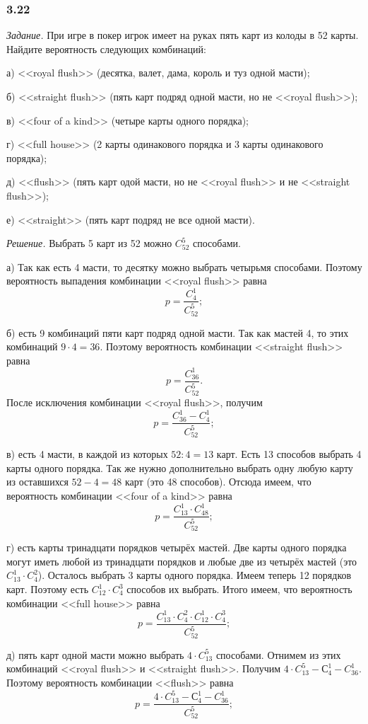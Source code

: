 \documentclass{book}
\begin{document}
\subsubsection*{3.22}

\textit{Задание.} При игре в покер игрок имеет на руках пять карт из колоды в 52 карты.
Найдите вероятность следующих комбинаций:

а) <<royal flush>> (десятка, валет, дама, король и туз одной масти);

б) <<straight flush>> (пять карт подряд одной масти, но не <<royal flush>>);

в) <<four of a kind>> (четыре карты одного порядка);

г) <<full house>> (2 карты одинакового порядка и 3 карты одинакового порядка);

д) <<flush>> (пять карт одой масти, но не <<royal flush>> и не <<straight flush>>);

е) <<straight>> (пять карт подряд не все одной масти).

\textit{Решение.} Выбрать 5 карт из 52 можно $ C_{52}^5 $ способами.

а) Так как есть 4 масти, то десятку можно выбрать четырьмя способами.
Поэтому вероятность выпадения комбинации <<royal flush>> равна
$$ p =
\frac{ C_4^1 }{ C_{52}^5 };$$

б) есть 9 комбинаций пяти карт подряд одной масти.
Так как мастей 4, то этих комбинаций $ 9 \cdot 4 = 36 $.
Поэтому вероятность комбинации <<straight flush>> равна
$$ p =
\frac{ C_{36}^1 }{ C_{52}^5 }.$$
После исключения комбинации <<royal flush>>, получим
$$ p =
\frac{ C_{36}^1 - C_4^1 }{ C_{52}^5 };$$

в) есть 4 масти, в каждой из которых $ 52 : 4 = 13 $ карт.
Есть 13 способов выбрать 4 карты одного порядка.
Так же нужно дополнительно выбрать одну любую карту из оставшихся $ 52 - 4 = 48 $ карт (это 48 способов).
Отсюда имеем, что вероятность комбинации <<four of a kind>> равна
$$ p =
\frac{ C_{13}^1 \cdot C_{48}^1 }{ C_{52}^5 };$$

г) есть карты тринадцати порядков четырёх мастей.
Две карты одного порядка могут иметь любой из тринадцати порядков и любые две из четырёх мастей (это $ C_{13}^1 \cdot C_4^2 $).
Осталось выбрать 3 карты одного порядка. Имеем теперь 12 порядков карт.
Поэтому есть $ C_{12}^1 \cdot C_4^3 $ способов их выбрать.
Итого имеем, что вероятность комбинации <<full house>> равна
$$ p =
\frac{ C_{13}^1 \cdot C_4^2 \cdot C_{12}^1 \cdot C_4^3 }{ C_{52}^5 };$$

д) пять карт одной масти можно выбрать $ 4 \cdot C_{13}^5 $ способами.
Отнимем из этих комбинаций <<royal flush>> и <<straight flush>>.
Получим $ 4 \cdot C_{13}^5 - С_4^1 - C_{36}^1 $.
Поэтому вероятность комбинации <<flush>> равна
$$ p =
\frac{ 4 \cdot C_{13}^5 - С_4^1 - C_{36}^1 }{ C_{52}^5 };$$
\end{document}
